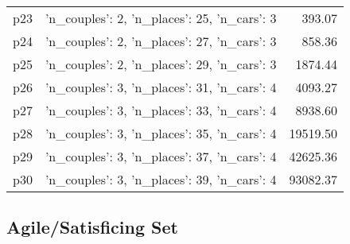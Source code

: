 \documentclass{article}
\begin{document}
\begin{center}
\begin{tabular}{@{}l|r|r@{}}
  p23&{'n\_couples': 2, 'n\_places': 25, 'n\_cars': 3}&393.07\\
  p24&{'n\_couples': 2, 'n\_places': 27, 'n\_cars': 3}&858.36\\
  p25&{'n\_couples': 2, 'n\_places': 29, 'n\_cars': 3}&1874.44\\
  p26&{'n\_couples': 3, 'n\_places': 31, 'n\_cars': 4}&4093.27\\
  p27&{'n\_couples': 3, 'n\_places': 33, 'n\_cars': 4}&8938.60\\
  p28&{'n\_couples': 3, 'n\_places': 35, 'n\_cars': 4}&19519.50\\
  p29&{'n\_couples': 3, 'n\_places': 37, 'n\_cars': 4}&42625.36\\
  p30&{'n\_couples': 3, 'n\_places': 39, 'n\_cars': 4}&93082.37
                            \end{tabular}
                            \end{center}
                    

                                \subsection*{Agile/Satisficing Set}
                                
\end{document}

